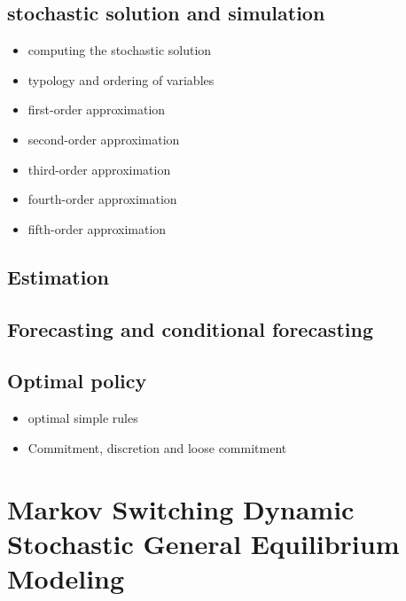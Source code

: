 \documentclass[letterpaper,10pt,english]{sphinxmanual}
\begin{document}
\section{stochastic solution and simulation}
\label{dsge_interface:stochastic-solution-and-simulation}\begin{itemize}
\item {} 
computing the stochastic solution

\item {} 
typology and ordering of variables

\item {} 
first-order approximation

\item {} 
second-order approximation

\item {} 
third-order approximation

\item {} 
fourth-order approximation

\item {} 
fifth-order approximation

\end{itemize}


\section{Estimation}
\label{dsge_interface:estimation}

\section{Forecasting and conditional forecasting}
\label{dsge_interface:forecasting-and-conditional-forecasting}

\section{Optimal policy}
\label{dsge_interface:optimal-policy}\begin{itemize}
\item {} 
optimal simple rules

\item {} 
Commitment, discretion and loose commitment

\end{itemize}


\chapter{Markov Switching Dynamic Stochastic General Equilibrium Modeling}
\label{classes/models/@dsge/dsge:markov-switching-dynamic-stochastic-general-equilibrium-modeling}\label{classes/models/@dsge/dsge::doc}
\end{document}

